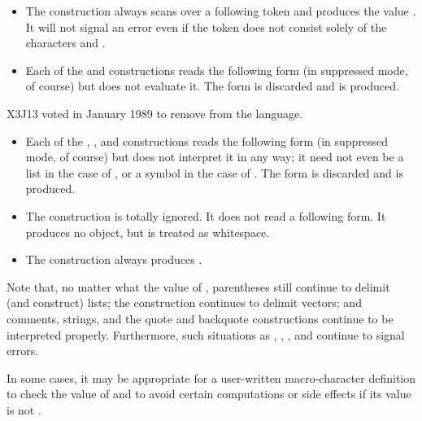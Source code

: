 \begin{defun}[Variable]
\begin{itemize}
\item
The \cd{\#*} construction always scans over a following token and
produces the value {\nil}.
It will not signal an error even if the token does not consist solely
of the characters  and .
\end{itemize}

\begin{obsolete}
\begin{itemize}
\item
Each of the  and \cd{\#,} constructions reads the following
form (in suppressed mode, of course) but does not evaluate it.
The form is discarded and {\nil} is produced.
\end{itemize}
\end{obsolete}

\begin{newer}
X3J13 voted in January 1989
 to remove \cd{\#,} from the language.
\end{newer}

\begin{itemize}
\item
Each of the , , and \cd{\#:}
constructions reads the following
form (in suppressed mode, of course) but does not interpret it in any way;
it need not even be a list in the case of , or a symbol
in the case of \cd{\#:}.  The form is discarded and {\nil} is produced.

\item
The \cd{\#=} construction is totally ignored.  It does not read
a following form.  It produces no object, but is treated as whitespace.

\item
The \cd{\#\#} construction always produces {\nil}.
\end{itemize}
Note that, no matter what the value of ,
parentheses still continue to delimit (and construct) lists;
the \cd{\#(} construction continues to delimit vectors;
and comments, strings, and the quote and backquote constructions continue to be
interpreted properly.  Furthermore, such situations as
,
\cd{\#<}, \cd{\#)}, and  continue to signal errors.

In some cases, it may be appropriate for a user-written macro-character
definition to check the value of  and to avoid certain
computations or side effects if its value is not {\nil}.
\end{defun}

